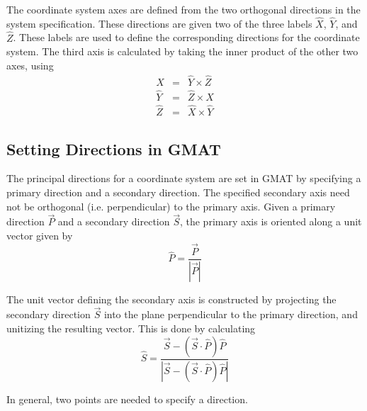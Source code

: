 The coordinate system axes are defined from the two orthogonal directions in the system
specification. These directions are given two of the three labels $\hat{X}$, $\hat{Y}$, and
$\hat{Z}$. These labels are used to define the corresponding directions for the coordinate
system. The third axis is calculated by taking the inner product of the other two axes, using
\begin{eqnarray}
\hat{X} & = & \hat{Y}\times\hat{Z}\nonumber \\
\hat{Y} & = & \hat{Z}\times\hat{X}\nonumber \\
\hat{Z} & = & \hat{X}\times\hat{Y}\label{eq:UnitVectorTriplets}\end{eqnarray}

\subsection{Setting Directions in GMAT}

The principal directions for a coordinate system are set in GMAT by specifying a primary direction
and a secondary direction. The specified secondary axis need not be orthogonal (i.e. perpendicular)
to the primary axis. Given a primary direction $\vec{P}$ and a secondary direction $\vec{S}$, the
primary axis is oriented along a unit vector given by
\begin{equation}\hat{P}=\frac{\vec{P}}{\left|\vec{P}\right|}\end{equation}

The unit vector defining the secondary axis is constructed by projecting the secondary direction
$\vec{S}$ into the plane perpendicular to the primary direction, and unitizing the resulting vector.
This is done by calculating
\begin{equation} \hat{S}=\frac{\vec{S}-\left(\vec{S}\cdot\hat{P}\right)\hat{P}}{\left|\vec{S}
-\left(\vec{S}\cdot\hat{ P}\right)\hat{P}\right|}\end{equation}

In general, two points are needed to specify a direction.
